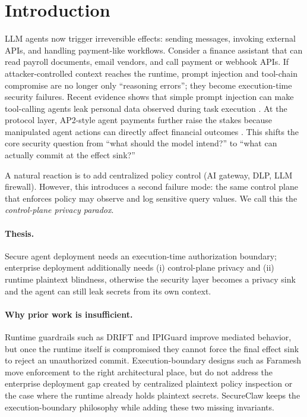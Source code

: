 
\section{Introduction}
\label{sec:intro}

LLM agents now trigger irreversible effects: sending messages, invoking external APIs, and handling payment-like workflows.
Consider a finance assistant that can read payroll documents, email vendors, and call payment or webhook APIs.
If attacker-controlled context reaches the runtime, prompt injection and tool-chain compromise are no longer only ``reasoning errors''; they become execution-time security failures.
Recent evidence shows that simple prompt injection can make tool-calling agents leak personal data observed during task execution \citep{alizadeh2025simple}.
At the protocol layer, AP2-style agent payments further raise the stakes because manipulated agent actions can directly affect financial outcomes \citep{ap2spec2025,whisperswealth2026}.
This shifts the core security question from ``what should the model intend?'' to ``what can actually commit at the effect sink?''

A natural reaction is to add centralized policy control (AI gateway, DLP, LLM firewall).
However, this introduces a second failure mode: the same control plane that enforces policy may observe and log sensitive query values.
We call this the \emph{control-plane privacy paradox}.

\paragraph{Thesis.}
Secure agent deployment needs an execution-time authorization boundary; enterprise deployment additionally needs (i) control-plane privacy and (ii) runtime plaintext blindness, otherwise the security layer becomes a privacy sink and the agent can still leak secrets from its own context.

\paragraph{Why prior work is insufficient.}
Runtime guardrails such as DRIFT and IPIGuard improve mediated behavior, but once the runtime itself is compromised they cannot force the final effect sink to reject an unauthorized commit.
Execution-boundary designs such as Faramesh move enforcement to the right architectural place, but do not address the enterprise deployment gap created by centralized plaintext policy inspection or the case where the runtime already holds plaintext secrets.
SecureClaw keeps the execution-boundary philosophy while adding these two missing invariants.

